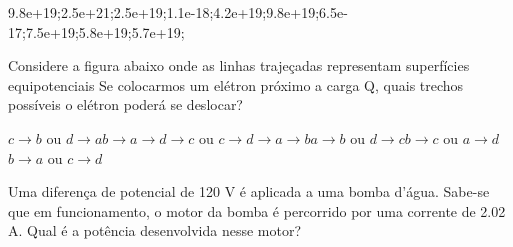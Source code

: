 \documentclass[12pt, addpoints]{exam}
\begin{document}
\begin{questions}
\begin{multicols*}{2}
\begin{oneparchoices}
\choice 9.8e+19;\choice 2.5e+21;\choice 2.5e+19;\choice 1.1e-18;\choice 4.2e+19;\choice 9.8e+19;\choice 6.5e-17;\choice 7.5e+19;\choice 5.8e+19;\choice 5.7e+19;\end{oneparchoices}
\question[20] Considere a figura abaixo onde as linhas trajeçadas representam superfícies equipotenciais Se colocarmos um elétron próximo a carga Q, quais trechos possíveis o elétron poderá se deslocar?
        
        \begin{center}
            \begin{minipage}[c]{0.5\linewidth}
            \end{minipage}
        \end{center}
        
        

\begin{choices}
\choice $c\rightarrow b$ ou $d\rightarrow a$\choice $b\rightarrow a\rightarrow d\rightarrow c$ ou $c\rightarrow d\rightarrow a\rightarrow b$\choice $a\rightarrow b$ ou $d\rightarrow c$\choice $b\rightarrow c$ ou $a\rightarrow d$\choice $b\rightarrow a$ ou $c\rightarrow d$\end{choices}
\question[20] Uma diferença de potencial de 120 V é aplicada a uma bomba d’água. Sabe-se que em funcionamento, o motor da bomba é percorrido por uma corrente de    2.02 A. Qual é a potência desenvolvida nesse motor?


\end{multicols*}
\end{questions}
\end{document}
